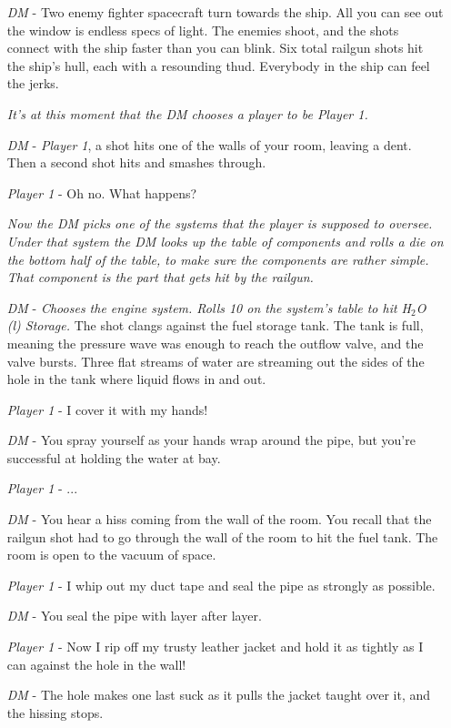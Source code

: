 \documentclass[a4paper]{article}
\begin{document}
\begin{enumerate}[leftmargin=2cm]
\item [\textit{DM}] - Two enemy fighter spacecraft turn towards the ship. All you can see out the window is endless specs of light. The enemies shoot, and the shots connect with the ship faster than you can blink. Six total railgun shots hit the ship's hull, each with a resounding thud. Everybody in the ship can feel the jerks. 
\item [] \textit{It's at this moment that the DM chooses a player to be Player 1.} 
\item [\textit{DM}] - \textit{Player 1}, a shot hits one of the walls of your room, leaving a dent. Then a second shot hits and smashes through.
\item [\textit{Player 1}] - Oh no. What happens?
\item [] \textit{Now the DM picks one of the systems that the player is supposed to oversee. Under that system the DM looks up the table of components and rolls a die on the bottom half of the table, to make sure the components are rather simple. That component is the part that gets hit by the railgun.}
\item [\textit{DM}] - \textit{Chooses the engine system. Rolls 10 on the system's table to hit H$_2$O (l) Storage.} The shot clangs against the fuel storage tank. The tank is full, meaning the pressure wave was enough to reach the outflow valve, and the valve bursts. Three flat streams of water are streaming out the sides of the hole in the tank where liquid flows in and out.
\item [\textit{Player 1}] - I cover it with my hands! 
\item [\textit{DM}] - You spray yourself as your hands wrap around the pipe, but you're successful at holding the water at bay.
\item [\textit{Player 1}] - ...
\item [\textit{DM}] - You hear a hiss coming from the wall of the room. You recall that the railgun shot had to go through the wall of the room to hit the fuel tank. The room is open to the vacuum of space.
\item [\textit{Player 1}] - I whip out my duct tape and seal the pipe as strongly as possible.
\item [\textit{DM}] - You seal the pipe with layer after layer.
\item [\textit{Player 1}] - Now I rip off my trusty leather jacket and hold it as tightly as I can against the hole in the wall!
\item [\textit{DM}] - The hole makes one last suck as it pulls the jacket taught over it, and the hissing stops.

\end{enumerate}
\end{document}
